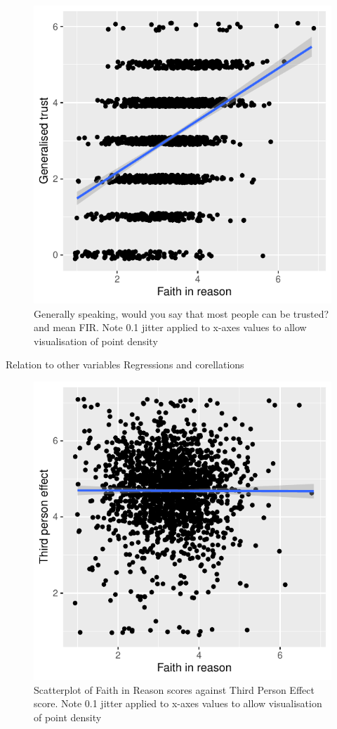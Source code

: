 \documentclass[
  ,jou,floatsintext]{apa6}
\begin{document}
\begin{figure}

{\centering \includegraphics[width=0.75\linewidth]{faithinreason_files/figure-latex/generalisetrust-1} 

}

\caption{Generally speaking, would you say that most people can be trusted? and mean FIR. Note 0.1 jitter applied to x-axes values to allow visualisation of point density}\label{fig:generalisetrust}
\end{figure}

Relation to other variables
Regressions and corellations

\begin{figure}

{\centering \includegraphics[width=0.75\linewidth]{faithinreason_files/figure-latex/tpe-1} 

}

\caption{Scatterplot of Faith in Reason scores against Third Person Effect score. Note 0.1 jitter applied to x-axes values to allow visualisation of point density}\label{fig:tpe}
\end{figure}
\end{document}
